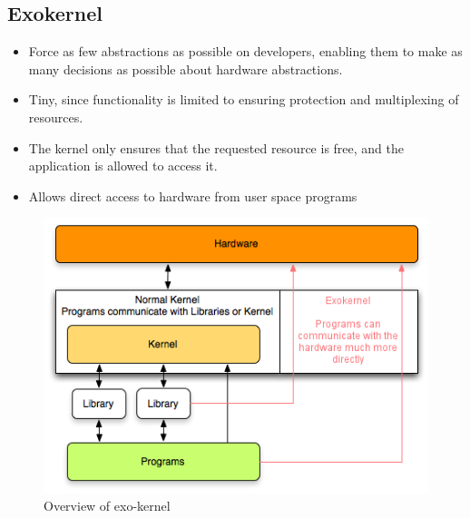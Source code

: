 \subsection{Exokernel}
\begin{itemize}
\item Force as few abstractions as possible on developers, enabling them to make as many decisions as possible about hardware abstractions.

\item Tiny, since functionality is limited to ensuring protection and multiplexing of resources.

\item The kernel only ensures that the requested resource is free, and the application is allowed to access it.

\item Allows direct access to hardware from user space programs
\end{itemize}

\begin{figure}[H]
  \centering
  \includegraphics[scale=0.5]{images/exokernel.png}
  \caption[Caption for LOF]{Overview of exo-kernel\footnotemark}
\end{figure}
